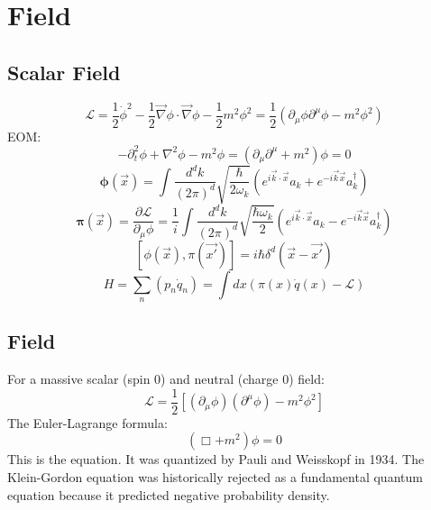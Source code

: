 \section{Field}
\subsection{Scalar Field}
$$ \mathcal{L} = \frac{1}{2}\dot{\phi}^{2} -
\frac{1}{2}\vec{\nabla}\phi \cdot \vec{\nabla}\phi - \frac{1}{2}m^{2}\phi^{2} 
= \frac{1}{2}(\partial_{\mu}\phi\partial^{\mu}\phi - m^{2}\phi^{2})$$
EOM:
$$ -\partial_{t}^{2}\phi + \nabla^{2}\phi - m^{2}\phi =
(\partial_{\mu}\partial^{\mu} + m^{2}) \phi = 0 $$
$$ \pmb{\phi}(\vec{x}) = \int
\frac{d^{d}k}{(2\pi)^{d}}\sqrt{\frac{\hbar}{2\omega_{k}}}(e^{i\vec{k}\cdot\vec{x}}a_{k}+e^{-i\vec{k}\vec{x}}a_{k}^{\dag})$$
$$ \pmb{\pi}(\vec{x}) = \frac{\partial{\mathcal{L}}}{\partial_{\mu}\phi} =
\frac{1}{i} \int \frac{d^{d}k}{(2\pi)^{d}}\sqrt{\frac{\hbar\omega_{k}}{2}}(e^{i\vec{k}\cdot\vec{x}}a_{k}-e^{-i\vec{k}\vec{x}}a_{k}^{\dag}) $$
$$ [\phi(\vec{x}), \pi(\vec{x'})] = i\hbar\delta^{d}(\vec{x} - \vec{x'})$$
$$ H =\sum_{n}(p_{n}\dot{q}_n) = \int dx(\pi(x)\dot{q}(x) -
\mathcal{L})  $$


\subsection{\KG{} Field}
For a massive scalar (spin 0) and neutral (charge 0) field:
$$\mathcal{L} = \frac{1}{2} [(\partial_{\mu}\phi)(\partial^{\mu}\phi) -
m^{2} \phi^{2}]$$
The Euler-Lagrange formula:
$$ (\Box + m^{2})\phi = 0$$
This is the \KG{} equation. It was quantized by Pauli and Weisskopf in 1934.
The Klein-Gordon equation was historically rejected as a fundamental quantum
equation because it predicted negative probability density.

